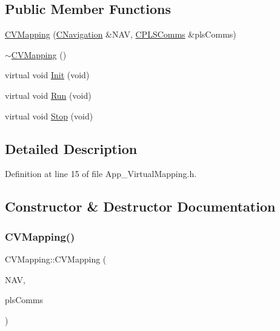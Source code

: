 \subsection*{Public Member Functions}
\begin{DoxyCompactItemize}
\item 
\mbox{\hyperlink{class_c_v_mapping_af6ee17cb269e87c9da52a22ef29b50df}{C\+V\+Mapping}} (\mbox{\hyperlink{class_c_navigation}{C\+Navigation}} \&N\+AV, \mbox{\hyperlink{class_c_p_l_s_comms}{C\+P\+L\+S\+Comms}} \&pls\+Comms)
\item 
\mbox{\hyperlink{class_c_v_mapping_af597f7af00322fe01ec8f74838b06f08}{$\sim$\+C\+V\+Mapping}} ()
\item 
virtual void \mbox{\hyperlink{class_c_v_mapping_a110257122b8946bcb8f17051070e03eb}{Init}} (void)
\item 
virtual void \mbox{\hyperlink{class_c_v_mapping_a8f064fcfd01953d7072efd5de23f89ef}{Run}} (void)
\item 
virtual void \mbox{\hyperlink{class_c_v_mapping_ad4e34f79b444109d0cbf1223881126dc}{Stop}} (void)
\end{DoxyCompactItemize}


\subsection{Detailed Description}


Definition at line 15 of file App\+\_\+\+Virtual\+Mapping.\+h.



\subsection{Constructor \& Destructor Documentation}
\mbox{\label{class_c_v_mapping_af6ee17cb269e87c9da52a22ef29b50df}} 
\subsubsection{\texorpdfstring{C\+V\+Mapping()}{CVMapping()}}
{\footnotesize\ttfamily C\+V\+Mapping\+::\+C\+V\+Mapping (\begin{DoxyParamCaption}\item[{\mbox{\hyperlink{class_c_navigation}{C\+Navigation}} \&}]{N\+AV,  }\item[{\mbox{\hyperlink{class_c_p_l_s_comms}{C\+P\+L\+S\+Comms}} \&}]{pls\+Comms }\end{DoxyParamCaption})}



